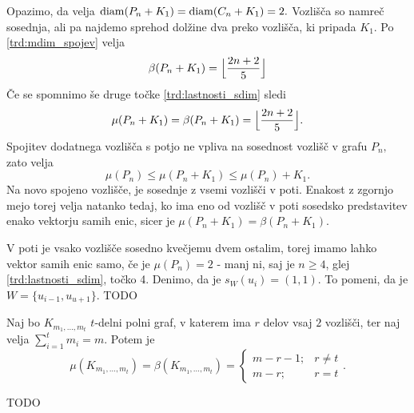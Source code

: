 \documentclass[mat1, tisk]{fmfdelo}
\newcommand{\1}{(1, 1, \ldots, 1)}
\newcommand{\2}{(2, 2, \ldots, 2)}
\begin{document}
\begin{dokaz}
    Opazimo, da velja ${\rm diam}(P_n + K_1) = {\rm diam}(C_n + K_1) = 2.$ Vozlišča so namreč sosednja, ali 
    pa najdemo sprehod dolžine dva preko vozlišča, ki pripada $K_1$. Po \ref{trd:mdim_spojev} velja 
    $$\beta(P_n + K_1) = \Bigl \lfloor \frac{2n + 2}{5}\Bigr \rfloor$$
    Če se spomnimo še druge točke \ref{trd:lastnosti_sdim} sledi 
    $$\mu(P_n + K_1) = \beta(P_n + K_1) = \Bigl \lfloor \frac{2n + 2}{5}\Bigr \rfloor.$$
    Spojitev dodatnega vozlišča s potjo ne vpliva na sosednost vozlišč v grafu $P_n,$ zato velja
    $$\mu(P_n) \leq \mu(P_n + K_1) \leq \mu(P_n) + K_1.$$
    Na novo spojeno vozlišče, je sosednje z vsemi vozlišči v poti. Enakost z zgornjo mejo torej velja natanko
    tedaj, ko ima eno od vozlišč v poti sosedsko predstavitev enako vektorju samih enic, sicer je 
    $\mu(P_n + K_1) = \beta(P_n + K_1).$
    
    V poti je vsako vozlišče sosedno kvečjemu dvem ostalim, torej imamo lahko vektor samih enic samo,
    če je $\mu(P_n) = 2$ - manj ni, saj je $n \geq 4$, glej \ref{trd:lastnosti_sdim}, točko 4.
    Denimo, da je $s_W(u_i) = (1, 1).$ To pomeni, da je $W =\{ u_{i-1}, u_{u+1}\}.$  
    TODO
\end{dokaz}


\begin{trditev}
    Naj bo $K_{m_1, \ldots, m_t}$ $t$-delni polni graf, v katerem ima $r$ delov vsaj $2$ vozlišči, 
    ter naj velja $\sum_{i=1}^{t} m_i = m.$ Potem je
    $$\mu(K_{m_1, \ldots, m_t}) = \beta(K_{m_1, \ldots, m_t}) = 
    \begin{cases}
        m - r - 1; & r \neq t \\
        m - r; & r = t 
    \end{cases}.$$
\end{trditev}

\begin{dokaz}
    TODO
\end{dokaz}



\end{document}
